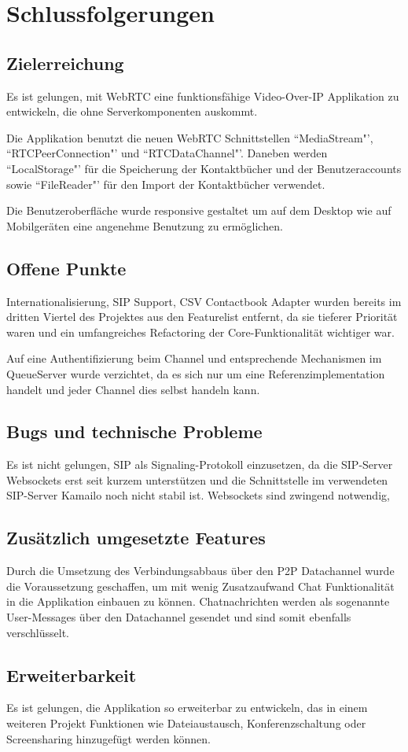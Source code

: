 \chapter{Schlussfolgerungen}
	\section{Zielerreichung}
		Es ist gelungen, mit WebRTC eine funktionsfähige Video-Over-IP Applikation zu entwickeln, die ohne Serverkomponenten auskommt.
		
		Die Applikation benutzt die neuen WebRTC Schnittstellen ``MediaStream"', ``RTCPeerConnection"' und ``RTCDataChannel"'. Daneben werden ``LocalStorage"' für die Speicherung der Kontaktbücher und der Benutzeraccounts sowie ``FileReader"' für den Import der Kontaktbücher verwendet.
		
		Die Benutzeroberfläche wurde responsive gestaltet um auf dem Desktop wie auf Mobilgeräten eine angenehme Benutzung zu ermöglichen.
	
	
	\section{Offene Punkte}
		Internationalisierung, SIP Support, CSV Contactbook Adapter wurden bereits im dritten Viertel des Projektes aus den Featurelist entfernt, da sie tieferer Priorität waren und ein umfangreiches Refactoring der Core-Funktionalität wichtiger war.
		
		Auf eine Authentifizierung beim Channel und entsprechende Mechanismen im QueueServer wurde verzichtet, da es sich nur um eine Referenzimplementation handelt und jeder Channel dies selbst handeln kann.
		
	
	\section{Bugs und technische Probleme}
		Es ist nicht gelungen, SIP als Signaling-Protokoll einzusetzen, da die SIP-Server Websockets erst seit kurzem unterstützen und die Schnittstelle im verwendeten SIP-Server Kamailo noch nicht stabil ist. Websockets sind zwingend notwendig,
		
	
	\section{Zusätzlich umgesetzte Features}
		Durch die Umsetzung des Verbindungsabbaus über den P2P Datachannel wurde die Voraussetzung geschaffen, um mit wenig Zusatzaufwand Chat Funktionalität in die Applikation einbauen zu können.
		Chatnachrichten werden als sogenannte User-Messages über den Datachannel gesendet und sind somit ebenfalls verschlüsselt.
		
	
	\section{Erweiterbarkeit}
		Es ist gelungen, die Applikation so erweiterbar zu entwickeln, das in einem weiteren Projekt Funktionen wie Dateiaustausch, Konferenzschaltung oder Screensharing hinzugefügt werden können.